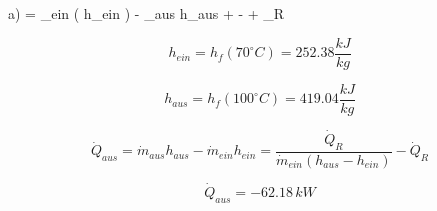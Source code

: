 a)  = _{ein} \left( h_{ein} \right) - _{aus} h_{aus} +  -  + _R

\[
h_{ein} = h_f \left( 70^\circ C \right) = 252.38 \frac{kJ}{kg}
\]

\[
h_{aus} = h_f \left( 100^\circ C \right) = 419.04 \frac{kJ}{kg}
\]

\[
\dot{Q}_{aus} = \dot{m}_{aus} h_{aus} - \dot{m}_{ein} h_{ein} = \frac{\dot{Q}_R}{\dot{m}_{ein} \left( h_{aus} - h_{ein} \right)} - \dot{Q}_R
\]

\[
\dot{Q}_{aus} = -62.18 \, kW
\]